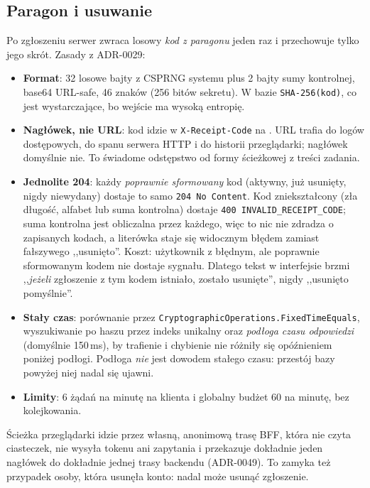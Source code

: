 \subsection{Paragon i usuwanie}

Po zgłoszeniu serwer zwraca losowy \emph{kod z paragonu} jeden raz i przechowuje
tylko jego skrót. Zasady z ADR-0029:

\begin{itemize}[leftmargin=*]
    \item \textbf{Format}: 32 losowe bajty z CSPRNG systemu plus 2 bajty sumy
    kontrolnej, base64 URL-safe, 46 znaków (256 bitów sekretu). W bazie
    \texttt{SHA-256(kod)}, co jest wystarczające, bo wejście ma wysoką entropię.
    \item \textbf{Nagłówek, nie URL}: kod idzie w \texttt{X-Receipt-Code} na
    . URL trafia do logów dostępowych, do
    spanu serwera HTTP i do historii przeglądarki; nagłówek domyślnie nie.
    To świadome odstępstwo od formy ścieżkowej z treści zadania.
    \item \textbf{Jednolite 204}: każdy \emph{poprawnie sformowany} kod
    (aktywny, już usunięty, nigdy niewydany) dostaje to samo
    \texttt{204 No Content}. Kod zniekształcony (zła długość, alfabet lub
    suma kontrolna) dostaje \texttt{400 INVALID\_RECEIPT\_CODE}; suma kontrolna
    jest obliczalna przez każdego, więc to nic nie zdradza o zapisanych kodach, a
    literówka staje się widocznym błędem zamiast fałszywego ,,usunięto''.
    Koszt: użytkownik z błędnym, ale poprawnie sformowanym kodem nie dostaje
    sygnału. Dlatego tekst w interfejsie brzmi ,,\emph{jeżeli} zgłoszenie z tym
    kodem istniało, zostało usunięte'', nigdy ,,usunięto pomyślnie''.
    \item \textbf{Stały czas}: porównanie przez
    \texttt{CryptographicOperations.FixedTimeEquals}, wyszukiwanie po haszu
    przez indeks unikalny oraz \emph{podłoga czasu odpowiedzi} (domyślnie
    150\,ms), by trafienie i chybienie nie różniły się opóźnieniem poniżej
    podłogi. Podłoga \emph{nie} jest dowodem stałego czasu: przestój bazy
    powyżej niej nadal się ujawni.
    \item \textbf{Limity}: 6 żądań na minutę na klienta i globalny budżet 60
    na minutę, bez kolejkowania.
\end{itemize}

Ścieżka przeglądarki idzie przez własną, anonimową trasę BFF, która nie czyta
ciasteczek, nie wysyła tokenu ani zapytania i przekazuje dokładnie jeden nagłówek
do dokładnie jednej trasy backendu (ADR-0049). To zamyka też przypadek osoby,
która usunęła konto: nadal może usunąć zgłoszenie.

